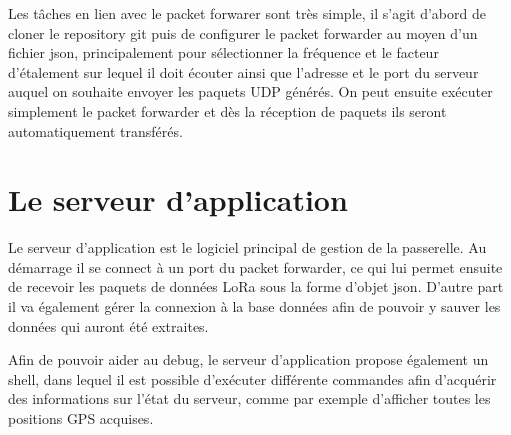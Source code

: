Les tâches en lien avec le packet forwarer sont très simple, il s'agit d'abord de cloner le repository git puis de configurer le packet forwarder au moyen d'un fichier json, principalement pour sélectionner la fréquence et le facteur d'étalement sur lequel il doit écouter ainsi que l'adresse et le port du serveur auquel on souhaite envoyer les paquets UDP générés. On peut ensuite exécuter simplement le packet forwarder et dès la réception de paquets ils seront automatiquement transférés.

\section{Le serveur d'application}

Le serveur d'application est le logiciel principal de gestion de la passerelle. Au démarrage il se connect à un port du packet forwarder, ce qui lui permet ensuite de recevoir les paquets de données LoRa sous la forme d'objet json. D'autre part il va également gérer la connexion à la base données afin de pouvoir y sauver les données qui auront été extraites.

Afin de pouvoir aider au debug, le serveur d'application propose également un shell, dans lequel il est possible d'exécuter différente commandes afin d'acquérir des informations sur l'état du serveur, comme par exemple d'afficher toutes les positions GPS acquises.




